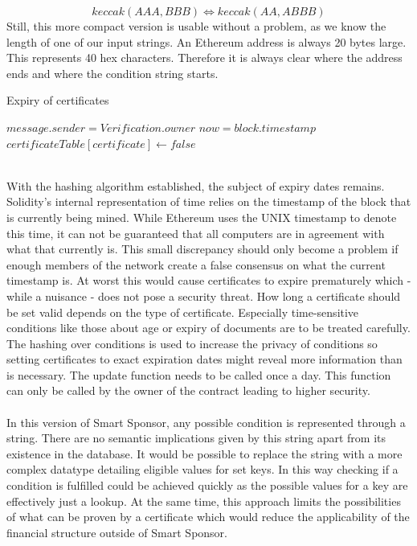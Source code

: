 \begin{equation*}
    keccak(AAA, BBB) \Longleftrightarrow keccak(AA, ABBB)
\end{equation*}
Still, this more compact version is usable without a problem, as we know the length of one of our input strings. An Ethereum address is always 20 bytes large. This represents 40 hex characters. Therefore it is always clear where the address ends and where the condition string starts.\\
\begin{algorithm}
\caption{Expiry of certificates}\label{alg:update}
\begin{algorithmic}
\Require $message.sender = Verification.owner$
\State $now = block.timestamp$
\State $certificateTable[certificate] \gets false$
\EndIf
\EndFor
\end{algorithmic}
\end{algorithm}
\\
With the hashing algorithm established, the subject of expiry dates remains. Solidity's internal representation of time relies on the timestamp of the block that is currently being mined. While Ethereum uses the UNIX timestamp to denote this time, it can not be guaranteed that all computers are in agreement with what that currently is. This small discrepancy should only become a problem if enough members of the network create a false consensus on what the current timestamp is. At worst this would cause certificates to expire prematurely which - while a nuisance - does not pose a security threat. How long a certificate should be set valid depends on the type of certificate. Especially time-sensitive conditions like those about age or expiry of documents are to be treated carefully. The hashing over conditions is used to increase the privacy of conditions so setting certificates to exact expiration dates might reveal more information than is necessary. The update function needs to be called once a day. This function can only be called by the owner of the contract leading to higher security.\\
\\
In this version of Smart Sponsor, any possible condition is represented through a string. There are no semantic implications given by this string apart from its existence in the database. It would be possible to replace the string with a more complex datatype detailing eligible values for set keys. In this way checking if a condition is fulfilled could be achieved quickly as the possible values for a key are effectively just a lookup. At the same time, this approach limits the possibilities of what can be proven by a certificate which would reduce the applicability of the financial structure outside of Smart Sponsor.\\ 

